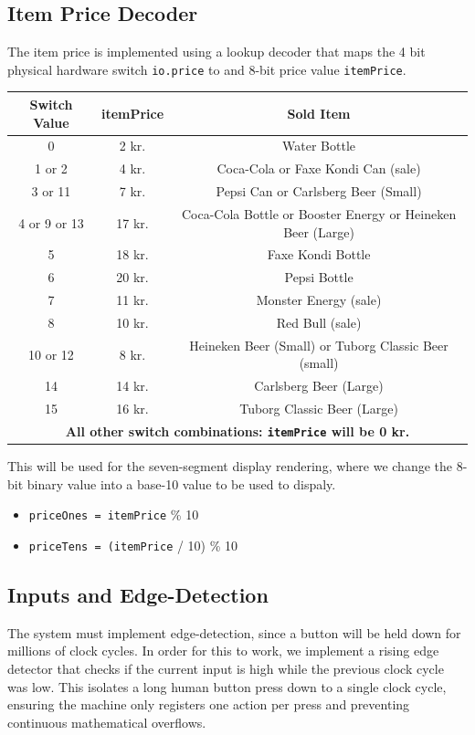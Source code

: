 \subsection{Item Price Decoder}
The item price is implemented using a lookup decoder that maps the 4 bit physical hardware switch \texttt{io.price} to and 8-bit price value \texttt{itemPrice}.
\renewcommand{\arraystretch}{1.3}
\begin{center}
    \begin{tabular}{ |c|c|c| }
    \hline
        Switch Value & itemPrice & Sold Item \\ 
        \hline \hline
        0 & 2 kr. & Water Bottle \\
        \hline
        1 or 2 & 4 kr. & Coca-Cola or Faxe Kondi Can (sale) \\
        \hline
        3 or 11 & 7 kr. & Pepsi Can or Carlsberg Beer (Small) \\
        \hline
        4 or 9 or 13 & 17 kr. & Coca-Cola Bottle or Booster Energy or Heineken Beer (Large) \\
        \hline
        5 & 18 kr. & Faxe Kondi Bottle \\
        \hline
        6 & 20 kr. & Pepsi Bottle \\
        \hline
        7 & 11 kr. & Monster Energy (sale) \\
        \hline
        8 & 10 kr. & Red Bull (sale) \\
        \hline
        10 or 12 & 8 kr. & Heineken Beer (Small) or Tuborg Classic Beer (small) \\
        \hline
        14 & 14 kr. & Carlsberg Beer (Large) \\
        \hline
        15 & 16 kr. & Tuborg Classic Beer (Large) \\
        \hline
        \multicolumn{3}{|p{11cm}|}{\textbf{All other switch combinations: \texttt{itemPrice} will be 0 kr.}} \\
    \hline
    \end{tabular}
\end{center}
This will be used for the seven-segment display rendering, where we change the 8-bit binary value into a base-10 value to be used to dispaly.
\begin{itemize}
    \item \texttt{priceOnes = itemPrice} \% 10
    \item \texttt{priceTens = (itemPrice} / 10) \% 10
\end{itemize}

\subsection{Inputs and Edge-Detection}
The system must implement edge-detection, since a button will be held down for millions of clock cycles. In order for this to work, we implement a rising edge detector that checks if the current input is high while the previous clock cycle was low. This isolates a long human button press down to a single clock cycle, ensuring the machine only registers one action per press and preventing continuous mathematical overflows.


